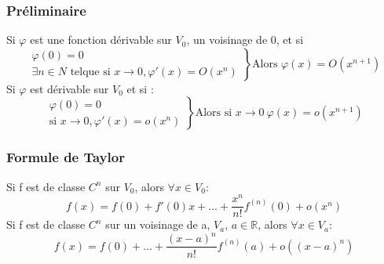 \subsubsection{Préliminaire}
\begin{theo}
Si $\varphi$ est une fonction dérivable sur $V_0$, un voisinage de 0, et si
\[\left.\begin{array}{l}
   \varphi(0)=0\\
   \exists n \in N \mbox{ telque si } x \rightarrow 0, \varphi'(x)=O(x^n)
  \end{array}\right\}
\mbox{Alors }\varphi(x)=O(x^{n+1})\]
Si $\varphi$ est dérivable sur $V_0$ et si :
\[\left.\begin{array}{l}
   \varphi(0)=0\\
    \mbox{si } x \rightarrow 0, \varphi'(x)=o(x^n)
  \end{array}\right\}
\mbox{Alors si }x\rightarrow0~ \varphi(x)=o(x^{n+1})\]
\end{theo}
\subsubsection{Formule de Taylor}
\begin{de}
 Si f est de classe $C^n$ sur $V_0$, alors $\forall x \in V_0$:
$$f(x) = f(0)+f'(0)x+...+\dfrac{x^n}{n!}f^{(n)}(0)+o(x^n)$$
Si f est de classe $C^n$ sur un voisinage de a, $V_a$, $a\in \mathbb{R}$, alors $\forall x \in V_a$:
$$f(x) = f(0)+...+\dfrac{(x-a)^n}{n!}f^{(n)}(a)+o((x-a)^n)$$
\end{de}
